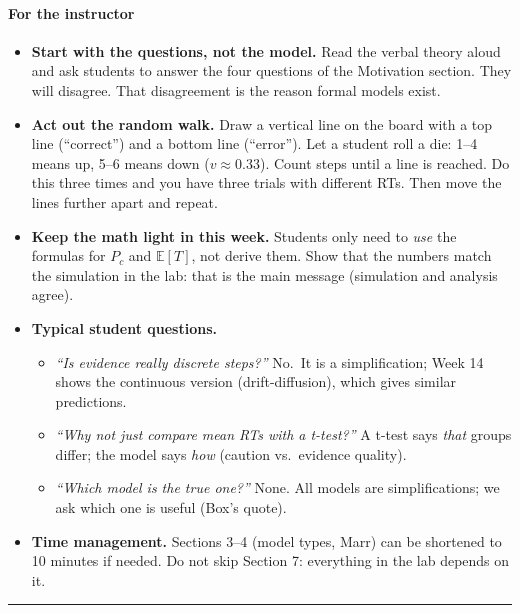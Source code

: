 \paragraph{For the instructor}

\begin{itemize}
\tightlist
\item
  \textbf{Start with the questions, not the model.} Read the verbal
  theory aloud and ask students to answer the four questions of the
  Motivation section. They will disagree. That disagreement is the
  reason formal models exist.
\item
  \textbf{Act out the random walk.} Draw a vertical line on the board
  with a top line (``correct'') and a bottom line (``error''). Let a
  student roll a die: 1--4 means up, 5--6 means down
  (\(v \approx 0.33\)). Count steps until a line is reached. Do this
  three times and you have three trials with different RTs. Then move
  the lines further apart and repeat.
\item
  \textbf{Keep the math light in this week.} Students only need to
  \emph{use} the formulas for \(P_c\) and \(\mathbb{E}[T]\), not derive
  them. Show that the numbers match the simulation in the lab: that is
  the main message (simulation and analysis agree).
\item
  \textbf{Typical student questions.}

  \begin{itemize}
  \tightlist
  \item
    \emph{``Is evidence really discrete steps?''} No.~It is a
    simplification; Week 14 shows the continuous version
    (drift-diffusion), which gives similar predictions.
  \item
    \emph{``Why not just compare mean RTs with a t-test?''} A t-test
    says \emph{that} groups differ; the model says \emph{how} (caution
    vs.~evidence quality).
  \item
    \emph{``Which model is the true one?''} None. All models are
    simplifications; we ask which one is useful (Box's quote).
  \end{itemize}
\item
  \textbf{Time management.} Sections 3--4 (model types, Marr) can be
  shortened to 10 minutes if needed. Do not skip Section 7: everything
  in the lab depends on it.
\end{itemize}

\begin{center}\rule{0.5\linewidth}{0.5pt}\end{center}

